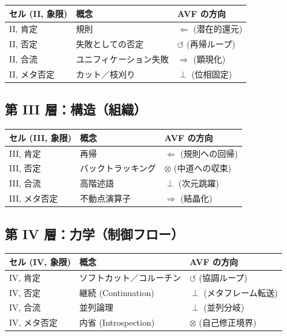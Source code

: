 \documentclass[12pt,a4paper]{ujarticle}
\begin{document}
\begin{table}[h]
\centering
\small
\begin{tabular}{|l|l|l|}
\hline
\textbf{セル (II, 象限)} & \textbf{概念} & \textbf{AVF の方向} \\
\hline
II, 肯定 & 規則 & $\Leftarrow$ (潜在的還元) \\
II, 否定 & 失敗としての否定 & $\circlearrowleft$ (再帰ループ) \\
II, 合流 & ユニフィケーション失敗 & $\Rightarrow$ (顕現化) \\
II, メタ否定 & カット／枝刈り & $\perp$ (位相固定) \\
\hline
\end{tabular}
\end{table}

\subsection{第 III 層：構造（組織）}

\begin{table}[h]
\centering
\small
\begin{tabular}{|l|l|l|}
\hline
\textbf{セル (III, 象限)} & \textbf{概念} & \textbf{AVF の方向} \\
\hline
III, 肯定 & 再帰 & $\Leftarrow$ (規則への回帰) \\
III, 否定 & バックトラッキング & $\otimes$ (中道への収束) \\
III, 合流 & 高階述語 & $\perp$ (次元跳躍) \\
III, メタ否定 & 不動点演算子 & $\Rightarrow$ (結晶化) \\
\hline
\end{tabular}
\end{table}

\subsection{第 IV 層：力学（制御フロー）}

\begin{table}[ht]
\centering
\small
\begin{tabular}{|l|l|l|}
\hline
\textbf{セル (IV, 象限)} & \textbf{概念} & \textbf{AVF の方向} \\
\hline
IV, 肯定 & ソフトカット／コルーチン & $\circlearrowleft$ (協調ループ) \\
IV, 否定 & 継続 (Continuation) & $\perp$ (メタフレーム転送) \\
IV, 合流 & 並列論理 & $\perp$ (並列分岐) \\
IV, メタ否定 & 内省 (Introspection) & $\otimes$ (自己修正境界) \\
\hline
\end{tabular}
\end{table}
\end{document}
